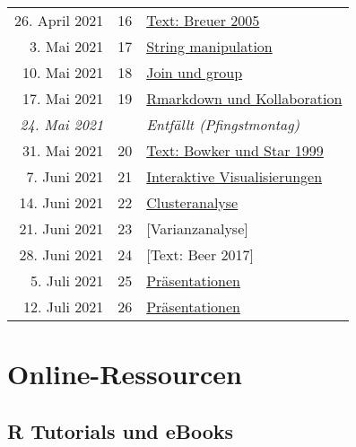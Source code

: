 \documentclass[
  ngerman,
]{article}
\begin{document}
\begin{longtable}[]{@{}rrl@{}}
26. April 2021 & 16 & \protect\hyperlink{text-breuer-2005}{Text: Breuer 2005} \\
3. Mai 2021 & 17 & \protect\hyperlink{string-manipulation}{String manipulation} \\
10. Mai 2021 & 18 & \protect\hyperlink{join-und-group}{Join und group} \\
17. Mai 2021 & 19 & \protect\hyperlink{rmarkdown-und-kollaboration}{Rmarkdown und Kollaboration} \\
\emph{24. Mai 2021} & & \emph{Entfällt (Pfingstmontag)} \\
31. Mai 2021 & 20 & \protect\hyperlink{text-bowker-und-star-1999}{Text: Bowker und Star 1999} \\
7. Juni 2021 & 21 & \protect\hyperlink{interaktive-visualisierungen}{Interaktive Visualisierungen} \\
14. Juni 2021 & 22 & \protect\hyperlink{clusteranalyse-1}{Clusteranalyse} \\
21. Juni 2021 & 23 & {[}Varianzanalyse{]} \\
28. Juni 2021 & 24 & {[}Text: Beer 2017{]} \\
5. Juli 2021 & 25 & \protect\hyperlink{pruxe4sentationen}{Präsentationen} \\
12. Juli 2021 & 26 & \protect\hyperlink{pruxe4sentationen}{Präsentationen} \\
\bottomrule
\end{longtable}

\hypertarget{online-ressourcen}{%
\section*{Online-Ressourcen}\label{online-ressourcen}}

\hypertarget{r-tutorials-und-ebooks}{%
\subsection*{R Tutorials und eBooks}\label{r-tutorials-und-ebooks}}
\end{document}
